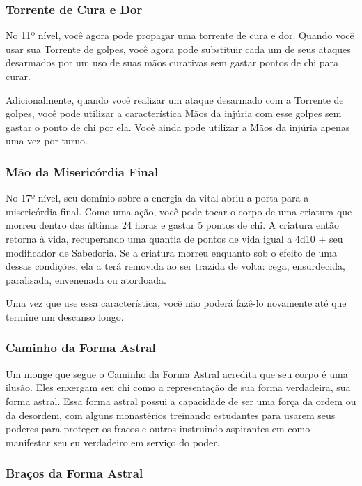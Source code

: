 \begin{multicols}{2}
\subsubsection*{Torrente de Cura e Dor}%
\label{ssub:torrente_de_cura_e_dor}

No 11º nível, você agora pode propagar uma torrente de cura e dor. Quando você
usar sua Torrente de golpes, você agora pode substituir cada um de seus ataques
desarmados por um uso de suas mãos curativas sem gastar pontos de chi para
curar.

Adicionalmente, quando você realizar um ataque desarmado com a Torrente de
golpes, você pode utilizar a característica Mãos da injúria com esse golpes sem
gastar o ponto de chi por ela. Você ainda pode utilizar a Mãos da injúria apenas
uma vez por turno.

\subsubsection*{Mão da Misericórdia Final}%
\label{ssub:mao_da_misericordia_final}

No 17º nível, seu domínio sobre a energia da vital abriu a porta para a
misericórdia final. Como uma ação, você pode tocar o corpo de uma criatura que
morreu dentro das últimas 24 horas e gastar 5 pontos de chi. A criatura então
retorna à vida, recuperando uma quantia de pontos de vida igual a 4d10 + seu
modificador de Sabedoria. Se a criatura morreu enquanto sob o efeito de uma
dessas condições, ela a terá removida ao ser trazida de volta: cega,
ensurdecida, paralisada, envenenada ou atordoada.

Uma vez que use essa característica, você não poderá fazê-lo novamente até que
termine um descanso longo.

\subsubsection*{Caminho da Forma Astral}%
\label{ssub:caminho_da_forma_astral}

Um monge que segue o Caminho da Forma Astral acredita que seu corpo é uma
ilusão. Eles enxergam seu chi como a representação de sua forma verdadeira, sua
forma astral. Essa forma astral possui a capacidade de ser uma força da ordem ou
da desordem, com alguns monastérios treinando estudantes para usarem seus
poderes para proteger os fracos e outros instruindo aspirantes em como
manifestar seu eu verdadeiro em serviço do poder.

\subsubsection*{Braços da Forma Astral}%
\label{ssub:bracos_da_forma_astral}


\end{multicols}
